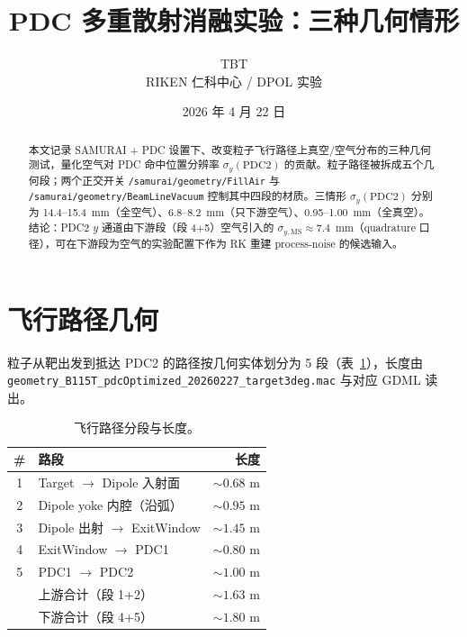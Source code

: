 \documentclass[a4paper, 11pt]{article}
\title{\textbf{PDC 多重散射消融实验：三种几何情形}}
\author{TBT \\ RIKEN 仁科中心 / DPOL 实验}
\date{2026 年 4 月 22 日}
\begin{document}
\maketitle

\begin{abstract}
\noindent
本文记录 SAMURAI + PDC 设置下、改变粒子飞行路径上真空/空气分布的三种几何测试，量化空气对 PDC 命中位置分辨率 $\sigma_y(\mathrm{PDC2})$ 的贡献。粒子路径被拆成五个几何段；两个正交开关 \texttt{/samurai/geometry/FillAir} 与 \texttt{/samurai/geometry/BeamLineVacuum} 控制其中四段的材质。三情形 $\sigma_y(\mathrm{PDC2})$ 分别为 14.4--15.4~mm（全空气）、6.8--8.2~mm（只下游空气）、0.95--1.00~mm（全真空）。结论：PDC2 $y$ 通道由下游段（段 4+5）空气引入的 $\sigma_{y,\mathrm{MS}}\approx 7.4$~mm（quadrature 口径），可在下游段为空气的实验配置下作为 RK 重建 process-noise 的候选输入。
\end{abstract}

\tableofcontents

\section{飞行路径几何}

粒子从靶出发到抵达 PDC2 的路径按几何实体划分为 5 段（表~\ref{tab:path}），长度由 \verb|geometry_B115T_pdcOptimized_20260227_target3deg.mac| 与对应 GDML 读出。

\begin{table}[H]
\centering
\caption{飞行路径分段与长度。}
\label{tab:path}
\begin{tabular}{clr}
\toprule
\# & 路段 & 长度 \\
\midrule
1 & Target $\to$ Dipole 入射面              & $\sim 0.68$ m \\
2 & Dipole yoke 内腔（沿弧）                 & $\sim 0.95$ m \\
3 & Dipole 出射 $\to$ ExitWindow             & $\sim 1.45$ m \\
4 & ExitWindow $\to$ PDC1                   & $\sim 0.80$ m \\
5 & PDC1 $\to$ PDC2                         & $\sim 1.00$ m \\
\midrule
  & 上游合计（段 1+2）                       & $\sim 1.63$ m \\
  & 下游合计（段 4+5）                       & $\sim 1.80$ m \\
\bottomrule
\end{tabular}
\end{table}
\end{document}
